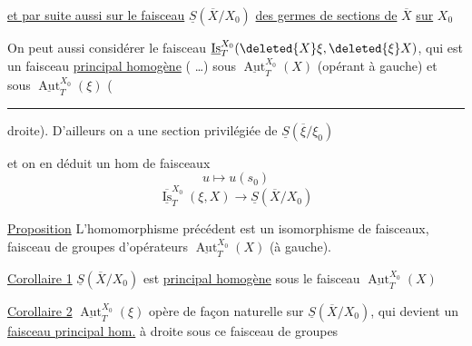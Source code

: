 \uline{et par suite aussi sur le faisceau} $\boxed{\underline S(\overline X/X_0)}$ \uline{des germes de sections de} $\overline X$ \uline{sur} $X_0$

On peut aussi considérer le faisceau $\underline{\operatorname{Is}}_T^{X_0}(\deleted{X}\xi,\deleted{\xi}X)$, qui est un faisceau \uline{principal homogène} ( \ldots) sous $\underline{\operatorname{Aut}}_T^{X_0}(X)$ (opérant à gauche) et sous $\underline{\operatorname{Aut}}_T^{X_0}(\xi)$ (\rule{2.5cm}{0.35pt} droite). D'ailleurs on a une section privilégiée  de $\underline S(\overline{\xi}/\xi_0)$

et on en déduit un hom de faisceaux
\[
u\longmapsto u(s_0)
\]
\[
\overline{\underline{\operatorname{Is}}}_T^{X_0}(\xi,X)\longrightarrow\underline S(\overline X/X_0)
\]

\uline{Proposition} L'homomorphisme précédent est un isomorphisme de faisceaux,   faisceau de groupes d'opérateurs $\underline{\operatorname{Aut}}_T^{X_0}(X)$ (à gauche).

\uline{Corollaire 1} $\underline S(\overline X/X_0)$ est \uline{principal homogène} sous le faisceau $\underline{\operatorname{Aut}}_T^{X_0}(X)$

\uline{Corollaire 2} $\underline{\operatorname{Aut}}_T^{X_0}(\xi)$ opère de façon naturelle  sur $\underline S(\overline X/X_0)$, qui devient un \uline{faisceau principal hom.} à droite sous ce faisceau de groupes 

